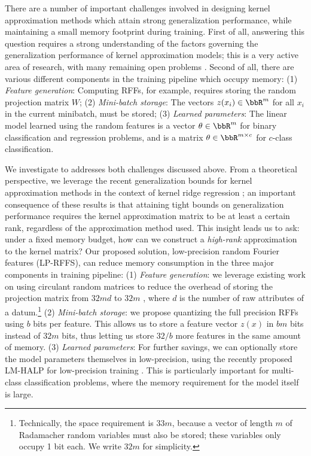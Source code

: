 There are a number of important challenges involved in designing kernel approximation methods which attain strong generalization performance, while maintaining a small memory footprint during training. First of all, answering this question requires a strong understanding of the factors governing the generalization performance of kernel approximation models; this is a very active area of research, with many remaining open problems \citep{rudi17,avron17,musco17,bach17}. Second of all, there are various different components in the training pipeline which occupy memory: (1) \textit{Feature generation}: Computing RFFs, for example, requires storing the random projection matrix $W$; (2) \textit{Mini-batch storage}: The vectors $z(x_i)\in\RR^m$ for all $x_i$ in the current minibatch, must be stored; (3) \textit{Learned parameters}: The linear model learned using the random features is a vector $\theta \in \RR^m$ for binary classification and regression problems, and is a matrix $\theta \in \RR^{m\times c}$ for $c$-class classification. %

We investigate to addresses both challenges discussed above. From a theoretical perspective, we leverage the recent generalization bounds for kernel approximation methods in the context of kernel ridge regression \citep{avron17,musco17}; an important consequence of these results is that attaining tight bounds on generalization performance requires the kernel approximation matrix to be at least a certain rank, regardless of the approximation method used. This insight leads us to ask: under a fixed memory budget, how can we construct a \textit{high-rank} approximation to the kernel matrix?  Our proposed solution, low-precision random Fourier features (LP-RFFS), can reduce memory consumption in the three major components in training pipeline: (1)  \textit{Feature generation}: we leverage existing work on using circulant random matrices to reduce the overhead of storing the projection matrix from $32md$ to $32m$ \citep{yu15}, where $d$ is the number of raw attributes of a datum.\footnote{Technically, the space requirement is $33m$, because a vector of length $m$ of Radamacher random variables must also be stored; these variables only occupy 1 bit each. We write $32m$ for simplicity.} (2) \textit{Mini-batch storage}: we propose quantizing the full precision RFFs using $b$ bits per feature. This allows us to store a feature vector $z(x)$ in $bm$ bits instead of $32m$ bits, thus letting us store $32/b$ more features in the same amount of memory. (3) \textit{Learned parameters}: For further savings, we can optionally store the model parameters themselves in low-precision, using the recently proposed LM-HALP for low-precision training \citep{halp18}. This is particularly important for multi-class classification problems, where the memory requirement for the model itself is large.

